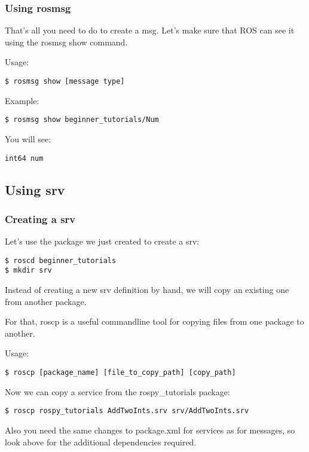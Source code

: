\subsubsection{Using rosmsg}
That's all you need to do to create a msg. Let's make sure that ROS can see it using the rosmsg show command.

Usage:

\begin{lstlisting}[breaklines=true languages=bash]
$ rosmsg show [message type]
\end{lstlisting}

Example:
\begin{lstlisting}[breaklines=true languages=bash]
$ rosmsg show beginner_tutorials/Num
\end{lstlisting}

You will see:
\begin{lstlisting}[breaklines=true languages=bash]
int64 num
\end{lstlisting}

\subsection{Using srv}
\subsubsection{Creating a srv}

Let's use the package we just created to create a srv:
\begin{lstlisting}[breaklines=true languages=bash]
$ roscd beginner_tutorials
$ mkdir srv
\end{lstlisting}

Instead of creating a new srv definition by hand, we will copy an existing one from another package.

For that, roscp is a useful commandline tool for copying files from one package to another.

Usage:
\begin{lstlisting}[breaklines=true languages=bash]
$ roscp [package_name] [file_to_copy_path] [copy_path]
\end{lstlisting}

Now we can copy a service from the rospy\_tutorials package:
\begin{lstlisting}[breaklines=true languages=bash]
$ roscp rospy_tutorials AddTwoInts.srv srv/AddTwoInts.srv
\end{lstlisting}

Also you need the same changes to package.xml for services as for messages, so look above for the additional dependencies required.

